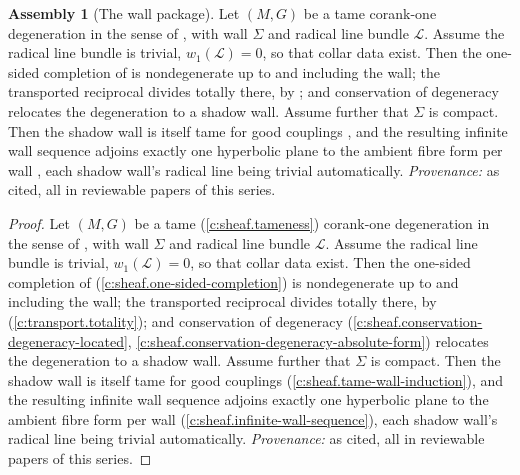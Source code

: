 \documentclass[11pt]{article}
\theoremstyle{definition}
\newtheorem{assembled}[theorem]{Assembly}
\theoremstyle{plain}
\begin{document}
\begin{assembled}[The wall package]\label{c:tower.wall-package}
Let $(M, G)$ be a tame corank-one degeneration in the sense of \cite[Hyp.~2.1]{ButlerT4}, with wall $\Sigma$ and radical line bundle $\mathcal{L}$. Assume the radical line bundle is trivial, $w_1(\mathcal{L}) = 0$, so that collar data exist. Then the one-sided completion of \cite[Thm.~4.4]{ButlerT4} is nondegenerate up to and including the wall; the transported reciprocal divides totally there, by \cite[Thm.~4.10]{ButlerT1}; and conservation of degeneracy \cite[Thm.~5.1, Prop.~5.2]{ButlerT4} relocates the degeneration to a shadow wall. Assume further that $\Sigma$ is compact. Then the shadow wall is itself tame for good couplings \cite[Lem.~5.3]{ButlerT4}, and the resulting infinite wall sequence adjoins exactly one hyperbolic plane to the ambient fibre form per wall \cite[Rem.~5.4, Cor.~5.5]{ButlerT4}, each shadow wall's radical line being trivial automatically. \emph{Provenance:} as cited, all in reviewable papers of this series.
\end{assembled}
\begin{proof}
Let $(M, G)$ be a tame (\ref{c:sheaf.tameness}) corank-one degeneration in the sense of \cite[Hyp.~2.1]{ButlerT4}, with wall $\Sigma$ and radical line bundle $\mathcal{L}$. Assume the radical line bundle is trivial, $w_1(\mathcal{L}) = 0$, so that collar data exist. Then the one-sided completion of \cite[Thm.~4.4]{ButlerT4} (\ref{c:sheaf.one-sided-completion}) is nondegenerate up to and including the wall; the transported reciprocal divides totally there, by \cite[Thm.~4.10]{ButlerT1} (\ref{c:transport.totality}); and conservation of degeneracy \cite[Thm.~5.1, Prop.~5.2]{ButlerT4} (\ref{c:sheaf.conservation-degeneracy-located}, \ref{c:sheaf.conservation-degeneracy-absolute-form}) relocates the degeneration to a shadow wall. Assume further that $\Sigma$ is compact. Then the shadow wall is itself tame for good couplings \cite[Lem.~5.3]{ButlerT4} (\ref{c:sheaf.tame-wall-induction}), and the resulting infinite wall sequence adjoins exactly one hyperbolic plane to the ambient fibre form per wall \cite[Rem.~5.4, Cor.~5.5]{ButlerT4} (\ref{c:sheaf.infinite-wall-sequence}), each shadow wall's radical line being trivial automatically. \emph{Provenance:} as cited, all in reviewable papers of this series.

\end{proof}
\end{document}
